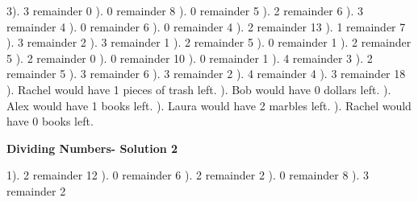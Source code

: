 \documentclass{article}%
\begin{document}
3). 3 remainder 0%
). 0 remainder 8%
). 0 remainder 5%
). 2 remainder 6%
). 3 remainder 4%
). 0 remainder 6%
). 0 remainder 4%
). 2 remainder 13%
). 1 remainder 7%
). 3 remainder 2%
). 3 remainder 1%
). 2 remainder 5%
). 0 remainder 1%
). 2 remainder 5%
). 2 remainder 0%
). 0 remainder 10%
). 0 remainder 1%
). 4 remainder 3%
). 2 remainder 5%
). 3 remainder 6%
). 3 remainder 2%
). 4 remainder 4%
). 3 remainder 18%
). Rachel would have 1 pieces of trash left.%
). Bob would have 0 dollars left.%
). Alex would have 1 books left.%
). Laura would have 2 marbles left.%
). Rachel would have 0 books left.%
\newline%
\newpage%
\large%
\begin{center}%
\textbf{Dividing Numbers- Solution 2}%
\newline%
\end{center} \normalsize%
1). 2 remainder 12%
). 0 remainder 6%
). 2 remainder 2%
). 0 remainder 8%
). 3 remainder 2%
\newline%
\end{document}
